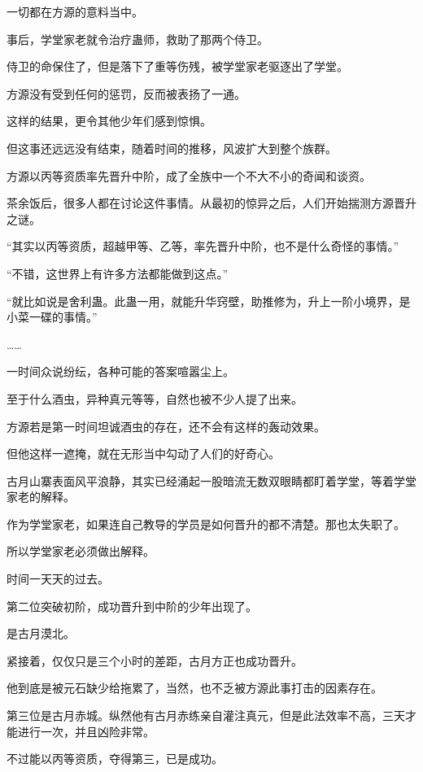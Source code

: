 
\begin{this_body}

一切都在方源的意料当中。

事后，学堂家老就令治疗蛊师，救助了那两个侍卫。

侍卫的命保住了，但是落下了重等伤残，被学堂家老驱逐出了学堂。

方源没有受到任何的惩罚，反而被表扬了一通。

这样的结果，更令其他少年们感到惊惧。

但这事还远远没有结束，随着时间的推移，风波扩大到整个族群。

方源以丙等资质率先晋升中阶，成了全族中一个不大不小的奇闻和谈资。

茶余饭后，很多人都在讨论这件事情。从最初的惊异之后，人们开始揣测方源晋升之谜。

“其实以丙等资质，超越甲等、乙等，率先晋升中阶，也不是什么奇怪的事情。”

“不错，这世界上有许多方法都能做到这点。”

“就比如说是舍利蛊。此蛊一用，就能升华窍壁，助推修为，升上一阶小境界，是小菜一碟的事情。”

……

一时间众说纷纭，各种可能的答案喧嚣尘上。

至于什么酒虫，异种真元等等，自然也被不少人提了出来。

方源若是第一时间坦诚酒虫的存在，还不会有这样的轰动效果。

但他这样一遮掩，就在无形当中勾动了人们的好奇心。

古月山寨表面风平浪静，其实已经涌起一股暗流无数双眼睛都盯着学堂，等着学堂家老的解释。

作为学堂家老，如果连自己教导的学员是如何晋升的都不清楚。那也太失职了。

所以学堂家老必须做出解释。

时间一天天的过去。

第二位突破初阶，成功晋升到中阶的少年出现了。

是古月漠北。

紧接着，仅仅只是三个小时的差距，古月方正也成功晋升。

他到底是被元石缺少给拖累了，当然，也不乏被方源此事打击的因素存在。

第三位是古月赤城。纵然他有古月赤练亲自灌注真元，但是此法效率不高，三天才能进行一次，并且凶险非常。

不过能以丙等资质，夺得第三，已是成功。


\end{this_body}
